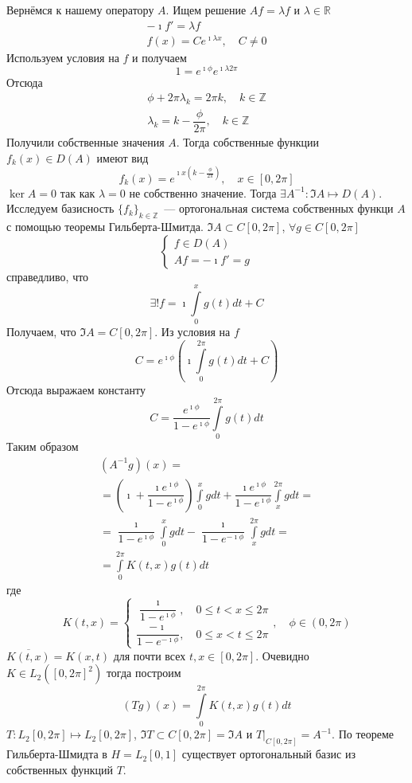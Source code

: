 \documentclass[14pt]{extarticle}
\begin{document}
\begin{Prim}
    Вернёмся к нашему оператору $A$.
    Ищем решение $Af = \lambda f$ и $\lambda \in \mathbb R$
    \begin{gather*}
        -\imath f' = \lambda f\\
        f(x) = C e^{\imath \lambda x},\quad C \neq 0
    \end{gather*}
    Используем условия на $f$ и получаем
    $$
    1 = e^{\imath \phi} e^{\imath \lambda 2 \pi}
    $$
    Отсюда
    \begin{gather*}
        \phi + 2 \pi \lambda_k = 2 \pi k,\quad k \in \mathbb Z\\
        \lambda_k = k - \dfrac{\phi}{2\pi},\quad k \in \mathbb Z
    \end{gather*}
    Получили собственные значения $A$.
    Тогда собственные функции $f_k(x) \in D(A)$ имеют вид
    $$
    f_k(x) = e^{\imath x (k - \frac{\phi}{2\pi})},\quad x \in [0, 2\pi]
    $$
    $\ker A = 0$ так как $\lambda = 0$ не собственно значение.
    Тогда $\exists A^{-1} : \Im A \mapsto D(A)$.
    Исследуем базисность $\{f_k\}_{k \in \mathbb Z}$~--- ортогональная система собственных 
    функци $A$ с помощью теоремы Гильберта-Шмитда.
    $\Im A \subset C[0, 2\pi]$, $\forall g \in C[0,2\pi]$
    $$
    \left\{
    \begin{array}{l}
        f \in D(A)\\
        Af = -\imath f' = g
    \end{array}
    \right.
    $$
    справедливо, что
    $$
    \exists! f = \imath \int\limits_0^x g(t) dt + C
    $$
    Получаем, что $\Im A = C[0,2\pi]$.
    Из условия на $f$
    $$
    C = e^{\imath \phi}\left(\imath \int\limits_0^{2\pi} g(t) dt + C\right)
    $$
    Отсюда выражаем константу
    $$
    C = \dfrac{e^{\imath \phi}}{1 - e^{\imath \phi}} \int\limits_0^{2\pi} g(t) dt
    $$
    Таким образом
    \begin{multline*}
    (A^{-1}g)(x) =\\= \left(\imath + \dfrac{\imath e^{\imath \phi}}{1 - e^{\imath \phi}}\right)
    \int\limits_0^x g dt + \dfrac{\imath e^{\imath \phi}}{1 - e^{\imath \phi}}\int\limits_x^{2\pi}g dt
    =\\= \dfrac{\imath}{1 - e^{\imath \phi}} \int\limits_0^x g dt - \dfrac{\imath}{1 - e^{-\imath 
    \phi}} \int\limits_x^{2\pi} g dt =\\= \int\limits_0^{2\pi}K(t, x)g(t)dt
    \end{multline*}
    где
    $$
    K(t, x) = \left\{
    \begin{array}{l}
        \dfrac{\imath}{1 - e^{\imath \phi}}, \quad 0 \le t < x \le 2\pi\\
        \dfrac{-\imath}{1 - e^{-\imath \phi}}, \quad 0 \le x < t \le 2\pi
    \end{array}
    \right., \quad \phi \in (0, 2\pi)
    $$
    $\overline{K(t, x)} = K(x, t)$ для почти всех $t, x \in [0, 2\pi]$.
    Очевидно $K \in L_2([0,2\pi]^2)$ тогда построим
    $$
    (Tg)(x) = \int\limits_0^{2 \pi}K(t, x)g(t)dt
    $$
    $T : L_2[0,2\pi] \mapsto L_2[0,2\pi]$, $\Im T \subset C[0,2\pi] = \Im A$ и $T|_{C[0,2\pi]} = 
    A^{-1}$.
    По теореме Гильберта-Шмидта в $H = L_2[0, 1]$ существует ортогональный базис из
    собственных функций $T$.
    

\end{Prim}
\end{document}
